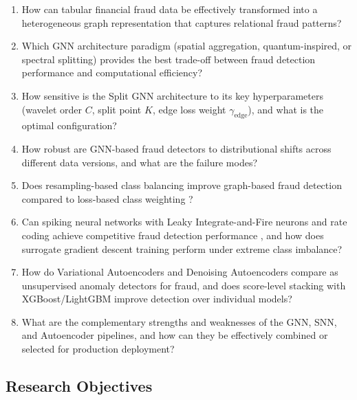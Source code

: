 \begin{enumerate}[label=RQ\arabic*.]
\item How can tabular financial fraud data be effectively transformed into a heterogeneous graph representation that captures relational fraud patterns?
\item Which GNN architecture paradigm (spatial aggregation, quantum-inspired, or spectral splitting) provides the best trade-off between fraud detection performance and computational efficiency?
\item How sensitive is the Split GNN architecture to its key hyperparameters (wavelet order $C$, split point $K$, edge loss weight $\gamma_{\text{edge}}$), and what is the optimal configuration?
\item How robust are GNN-based fraud detectors to distributional shifts across different data versions, and what are the failure modes?
\item Does resampling-based class balancing improve graph-based fraud detection compared to loss-based class weighting \cite{farahat2025objective}?
\item Can spiking neural networks with Leaky Integrate-and-Fire neurons and rate coding achieve competitive fraud detection performance \cite{nasif2026reinforcement}, and how does surrogate gradient descent training perform under extreme class imbalance?
\item How do Variational Autoencoders \cite{kingma2014auto} and Denoising Autoencoders \cite{vincent2010stacked} compare as unsupervised anomaly detectors for fraud, and does score-level stacking with XGBoost/LightGBM \cite{chen2016xgboost,ke2017lightgbm} improve detection over individual models?
\item What are the complementary strengths and weaknesses of the GNN, SNN, and Autoencoder pipelines, and how can they be effectively combined or selected for production deployment?
\end{enumerate}

\subsection{Research Objectives}

